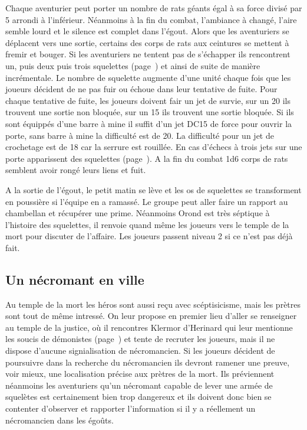 Chaque aventurier peut porter un nombre de rats géants égal à sa force divisé par 5 arrondi à l'inférieur.
Néanmoins à la fin du combat, l'ambiance à changé, l'aire semble lourd et le silence est complet dans 
l'égout. Alors que les aventuriers se déplacent vers une sortie, certains des corps 
de rats aux ceintures se mettent à fremir et bouger. Si les aventuriers ne tentent pas de s'échapper 
ils rencontrent un, puis deux puis trois squelettes (page~\pageref{Squelette}) et ainsi de suite de 
manière incrémentale. Le nombre de squelette augmente d'une unité chaque fois que les joueurs 
décident de ne pas fuir ou échoue dans leur tentative de fuite. Pour chaque tentative de fuite, les 
joueurs doivent fair un jet de survie, sur un 20 ils trouvent une sortie non bloquée, sur un 15 ils trouvent
une sortie bloquée. Si ils sont équippés d'une barre à mine il suffit d'un jet DC15 de force pour 
ouvrir la porte, sans barre à mine la difficulté est de 20. La difficulté pour un jet de crochetage est de 
18 car la serrure est rouillée. En cas d'échecs à trois jets sur une porte apparissent des squelettes
(page~\pageref{Squelette}). A la fin du combat 1d6 corps de rats semblent avoir rongé leurs liens et fuit. 

A la sortie de l'égout, le petit matin se lève et les os de squelettes se transforment en poussière si 
l'équipe en a ramassé. Le groupe peut aller faire un rapport au chambellan et récupérer une prime. 
Néanmoins Orond est très séptique à l'histoire des squelettes, il renvoie quand même les joueurs vers 
le temple de la mort pour discuter de l'affaire. Les joueurs passent niveau 2 si ce n'est pas déjà fait.

\subsection{Un nécromant en ville}

Au temple de la mort les héros sont aussi reçu avec scéptisicisme, mais les prètres sont tout de même
intressé. On leur propose en premier lieu d'aller se renseigner au temple de la justice, où il rencontres
Klermor d'Herinard qui leur mentionne les soucis de démonistes (page~\pageref{Demoniste}) et tente de 
recruter les joueurs, mais il ne dispose d'aucune signialisation de nécromancien. Si les joueurs décident
de poursuivre dans la recherche du nécromancien ils devront ramener une preuve, voir mieux, une 
localisation précise aux prètres de la mort. Ils préviennent néanmoins les aventuriers qu'un nécromant 
capable de lever une armée de squelètes est certainement bien trop dangereux et ils doivent donc bien
se contenter d'observer et rapporter l'information si il y a réellement un nécromancien dans les égoûts.

